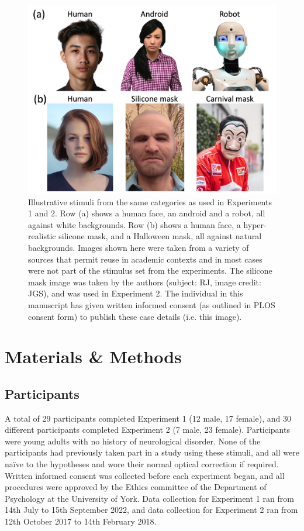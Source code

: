 \documentclass[
]{article}
\begin{document}
\begin{figure}

{\centering \includegraphics[width=0.8\linewidth]{Figures/stimfigure} 

}

\caption{Illustrative stimuli from the same categories as used in Experiments 1 and 2. Row (a) shows a human face, an android and a robot, all against white backgrounds. Row (b) shows a human face, a hyper-realistic silicone mask, and a Halloween mask, all against natural backgrounds. Images shown here were taken from a variety of sources that permit reuse in academic contexts and in most cases were not part of the stimulus set from the experiments. The silicone mask image was taken by the authors (subject: RJ, image credit: JGS), and was used in Experiment 2. The individual in this manuscript has given written informed consent (as outlined in PLOS consent form) to publish these case details (i.e. this image).}\label{fig:stimexamples}
\end{figure}

\section{Materials \& Methods}\label{materials-methods}

\subsection{Participants}\label{participants}

A total of 29 participants completed Experiment 1 (12 male, 17 female), and 30 different participants completed Experiment 2 (7 male, 23 female). Participants were young adults with no history of neurological disorder. None of the participants had previously taken part in a study using these stimuli, and all were naïve to the hypotheses and wore their normal optical correction if required. Written informed consent was collected before each experiment began, and all procedures were approved by the Ethics committee of the Department of Psychology at the University of York. Data collection for Experiment 1 ran from 14th July to 15th September 2022, and data collection for Experiment 2 ran from 12th October 2017 to 14th February 2018.
\end{document}
